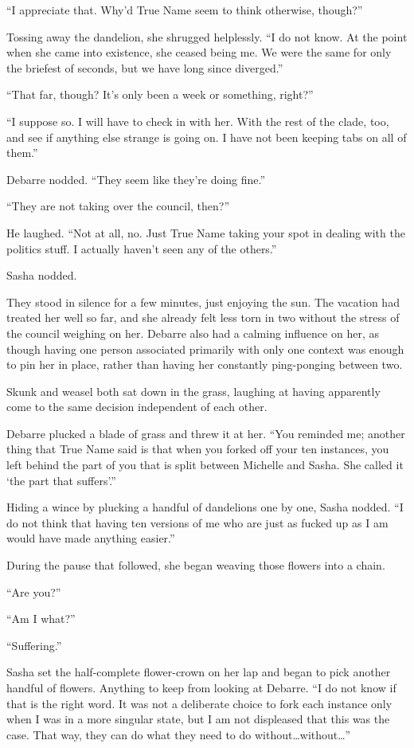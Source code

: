 ``I appreciate that. Why'd True Name seem to think otherwise, though?''

Tossing away the dandelion, she shrugged helplessly. ``I do not know. At the point when she came into existence, she ceased being me. We were the same for only the briefest of seconds, but we have long since diverged.''

``That far, though? It's only been a week or something, right?''

``I suppose so. I will have to check in with her. With the rest of the clade, too, and see if anything else strange is going on. I have not been keeping tabs on all of them.''

Debarre nodded. ``They seem like they're doing fine.''

``They are not taking over the council, then?''

He laughed. ``Not at all, no. Just True Name taking your spot in dealing with the politics stuff. I actually haven't seen any of the others.''

Sasha nodded.

They stood in silence for a few minutes, just enjoying the sun. The vacation had treated her well so far, and she already felt less torn in two without the stress of the council weighing on her. Debarre also had a calming influence on her, as though having one person associated primarily with only one context was enough to pin her in place, rather than having her constantly ping-ponging between two.

Skunk and weasel both sat down in the grass, laughing at having apparently come to the same decision independent of each other.

Debarre plucked a blade of grass and threw it at her. ``You reminded me; another thing that True Name said is that when you forked off your ten instances, you left behind the part of you that is split between Michelle and Sasha. She called it `the part that suffers'.''

Hiding a wince by plucking a handful of dandelions one by one, Sasha nodded. ``I do not think that having ten versions of me who are just as fucked up as I am would have made anything easier.''

During the pause that followed, she began weaving those flowers into a chain.

``Are you?''

``Am I what?''

``Suffering.''

Sasha set the half-complete flower-crown on her lap and began to pick another handful of flowers. Anything to keep from looking at Debarre. ``I do not know if that is the right word. It was not a deliberate choice to fork each instance only when I was in a more singular state, but I am not displeased that this was the case. That way, they can do what they need to do without\ldots without\ldots{}''


